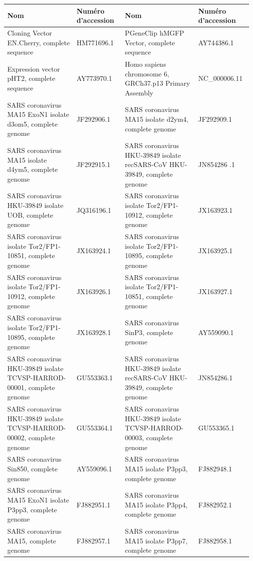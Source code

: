 \documentclass[10.9pt]{article} %
\begin{document}
 \footnotesize{
\begin{longtable}{|p{4.5cm}|p{3.5cm}|p{4.5cm}|p{3.5cm}|}
\hline
 Nom & Numéro d'accession & Nom & Numéro d'accession\\
 \hline \endhead
 Cloning Vector EN.Cherry, complete sequence & HM771696.1 & PGeneClip hMGFP Vector, complete sequence & AY744386.1 \\
 \hline
 Expression vector pHT2, complete sequence & AY773970.1 & Homo sapiens chromosome 6, GRCh37.p13 Primary Assembly & NC\_000006.11 \\
 \hline 
 SARS coronavirus MA15 ExoN1 isolate d3om5, complete genome & JF292906.1 & SARS coronavirus MA15 isolate d2ym4, complete genome & JF292909.1 \\
 \hline
  SARS coronavirus MA15 isolate d4ym5, complete genome & JF292915.1 & SARS coronavirus HKU-39849 isolate recSARS-CoV HKU-39849, 
  complete genome & JN854286 .1 \\
 \hline
   SARS coronavirus HKU-39849 isolate UOB, complete genome & JQ316196.1 & SARS coronavirus isolate Tor2/FP1-10912, complete genome & JX163923.1 \\
 \hline
 SARS coronavirus isolate Tor2/FP1-10851, complete genome & JX163924.1  & SARS coronavirus isolate Tor2/FP1-10895, complete genome & JX163925.1 \\
 \hline
  SARS coronavirus isolate Tor2/FP1-10912, complete genome & JX163926.1  & SARS coronavirus isolate Tor2/FP1-10851, complete genome & JX163927.1 \\
 \hline
   SARS coronavirus isolate Tor2/FP1-10895, complete genome & JX163928.1  & SARS coronavirus SinP3, complete genome & AY559090.1 \\
 \hline
  SARS coronavirus HKU-39849 isolate TCVSP-HARROD-00001, complete genome & GU553363.1  & SARS coronavirus HKU-39849 isolate recSARS-CoV HKU-39849, complete genome & JN854286.1 \\
 \hline
  SARS coronavirus HKU-39849 isolate TCVSP-HARROD-00002, complete genome & GU553364.1  & SARS coronavirus HKU-39849 isolate TCVSP-HARROD-00003, complete genome & GU553365.1 \\
 \hline
  SARS coronavirus Sin850, complete genome & AY559096.1  & SARS coronavirus MA15 isolate P3pp3, complete genome & FJ882948.1 \\
 \hline
  SARS coronavirus MA15 ExoN1 isolate P3pp3, complete genome & FJ882951.1  & SARS coronavirus MA15 isolate P3pp4, complete genome & FJ882952.1 \\
 \hline
  SARS coronavirus MA15, complete genome & FJ882957.1   & SARS coronavirus MA15 isolate P3pp7, complete genome & FJ882958.1 \\

\end{longtable}}
\end{document}
